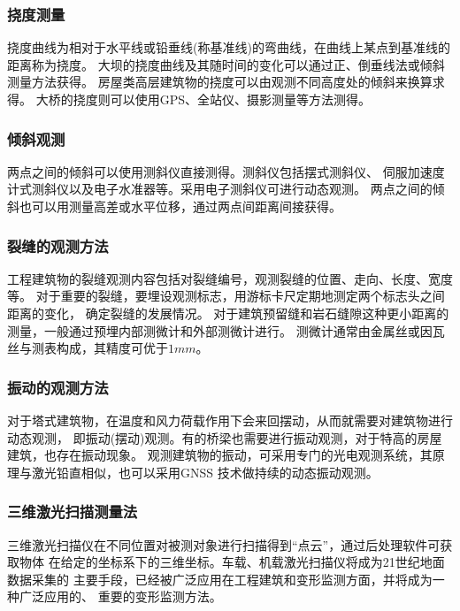 \subsubsection*{挠度测量}
挠度曲线为相对于水平线或铅垂线(称基准线)的弯曲线，在曲线上某点到基准线的距离称为挠度。
大坝的挠度曲线及其随时间的变化可以通过正、倒垂线法或倾斜测量方法获得。
房屋类高层建筑物的挠度可以由观测不同高度处的倾斜来换算求得。
大桥的挠度则可以使用GPS、全站仪、摄影测量等方法测得。
\subsubsection*{倾斜观测}
两点之间的倾斜可以使用测斜仪直接测得。测斜仪包括摆式测斜仪、
伺服加速度计式测斜仪以及电子水准器等。采用电子测斜仪可进行动态观测。
两点之间的倾斜也可以用测量高差或水平位移，通过两点间距离间接获得。
\subsubsection*{裂缝的观测方法}
工程建筑物的裂缝观测内容包括对裂缝编号，观测裂缝的位置、走向、长度、宽度等。
对于重要的裂缝，要埋设观测标志，用游标卡尺定期地测定两个标志头之间距离的变化，
确定裂缝的发展情况。
对于建筑预留缝和岩石缝隙这种更小距离的测量，一般通过预埋内部测微计和外部测微计进行。
测微计通常由金属丝或因瓦丝与测表构成，其精度可优于$1mm$。
\subsubsection*{振动的观测方法}
对于塔式建筑物，在温度和风力荷载作用下会来回摆动，从而就需要对建筑物进行动态观测，
即振动(摆动)观测。有的桥梁也需要进行振动观测，对于特高的房屋建筑，也存在振动现象。
观测建筑物的振动，可采用专门的光电观测系统，其原理与激光铅直相似，也可以采用GNSS
技术做持续的动态振动观测。
\subsubsection*{三维激光扫描测量法}
三维激光扫描仪在不同位置对被测对象进行扫描得到“点云”，通过后处理软件可获取物体
在给定的坐标系下的三维坐标。车载、机载激光扫描仪将成为21世纪地面数据采集的
主要手段，已经被广泛应用在工程建筑和变形监测方面，并将成为一种广泛应用的、
重要的变形监测方法。
